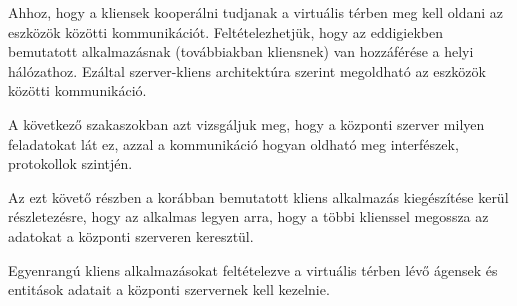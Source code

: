 
Ahhoz, hogy a kliensek kooperálni tudjanak a virtuális térben meg kell oldani az eszközök közötti kommunikációt.
Feltételezhetjük, hogy az eddigiekben bemutatott alkalmazásnak (továbbiakban kliensnek) van hozzáférése a helyi hálózathoz.
Ezáltal szerver-kliens architektúra szerint megoldható az eszközök közötti kommunikáció.

A következő szakaszokban azt vizsgáljuk meg, hogy a központi szerver milyen feladatokat lát ez, azzal a kommunikáció hogyan oldható meg interfészek, protokollok szintjén.

Az ezt követő részben a korábban bemutatott kliens alkalmazás kiegészítése kerül részletezésre, hogy az alkalmas legyen arra, hogy a többi klienssel megossza az adatokat a központi szerveren keresztül.


Egyenrangú kliens alkalmazásokat feltételezve a virtuális térben lévő ágensek és entitások adatait a központi szervernek kell kezelnie.




